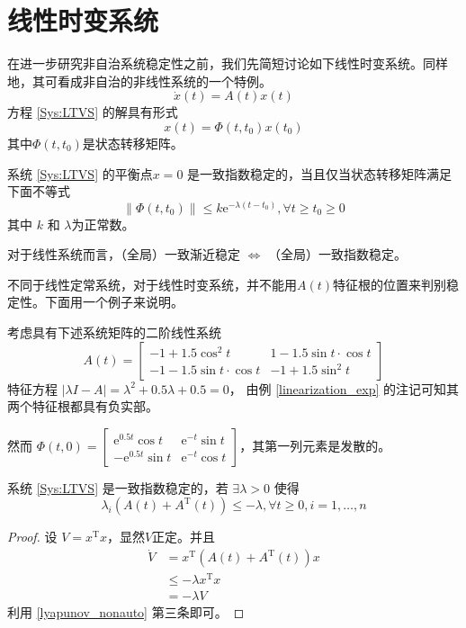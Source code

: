 \section{线性时变系统}\label{3Dref}
在进一步研究非自治系统稳定性之前，我们先简短讨论如下线性时变系统。同样地，其可看成非自治的非线性系统的一个特例。
\begin{equation}
  \dot{x}(t) = A (t) x(t) \label{Sys:LTVS}
\end{equation}
方程 \eqref{Sys:LTVS} 的解具有形式
\[ x (t) = \Phi (t, t_0) x (t_0) \]
其中$\Phi (t, t_0)$是状态转移矩阵。

\begin{theorem}
 系统 \eqref{Sys:LTVS} 的平衡点$x = 0$ 是一致指数稳定的，当且仅当状态转移矩阵满足下面不等式
  \[ \| \Phi (t, t_0) \| \leq k  \mathrm{e}^{- \lambda (t - t_0)}, \forall t \geq t_0
     \geq 0 \]
  其中 $k$ 和 $\lambda$为正常数。
\end{theorem}
\begin{note}
  对于线性系统而言，（全局）一致渐近稳定 $\iff$ （全局）一致指数稳定。
\end{note}
不同于线性定常系统，对于线性时变系统，并不能用$A (t)$特征根的位置来判别稳定性。下面用一个例子来说明。
\begin{example}
  考虑具有下述系统矩阵的二阶线性系统
  \[ A (t) = \left[\begin{array}{cc}
       - 1 + 1.5 \cos^2 t & 1 - 1.5 \sin  t \cdot \cos  t\\
       - 1 - 1.5 \sin  t \cdot \cos  t & - 1 + 1.5 \sin^2 t
     \end{array}\right] \]
 特征方程 $| \lambda I - A | = \lambda^2 + 0.5 \lambda + 0.5 = 0$，
 由例 \ref{linearization_exp} 的注记可知其两个特征根都具有负实部。
  
  然而 $\Phi (t, 0) = \left[\begin{array}{cc}
    \mathrm{e}^{0.5 t} \cos  t & \mathrm{e}^{- t} \sin  t\\
    -\mathrm{e}^{0.5 t} \sin  t & \mathrm{e}^{- t} \cos  t
  \end{array}\right]$，其第一列元素是发散的。
\end{example}

\begin{corollary}\label{ltvs_lambda}
  系统 \eqref{Sys:LTVS} 是一致指数稳定的，若 $\exists \lambda > 0$ 使得
  \[ \lambda_i (A (t) + A^\mathrm{T} (t)) \leq - \lambda, \forall t \geq 0, i = 1,
     \ldots, n \]
\end{corollary}
\begin{proof}
    设 $V = x^\mathrm{T} x$，显然$V$正定。并且
  \begin{align*}
    \dot{V} & =  x^\mathrm{T} (A (t) + A^\mathrm{T} (t)) x\\
    & \leq  - \lambda x^\mathrm{T} x\\
    & =  - \lambda V
  \end{align*}
  利用 \ref{lyapunov_nonauto} 第三条即可。
\end{proof}

